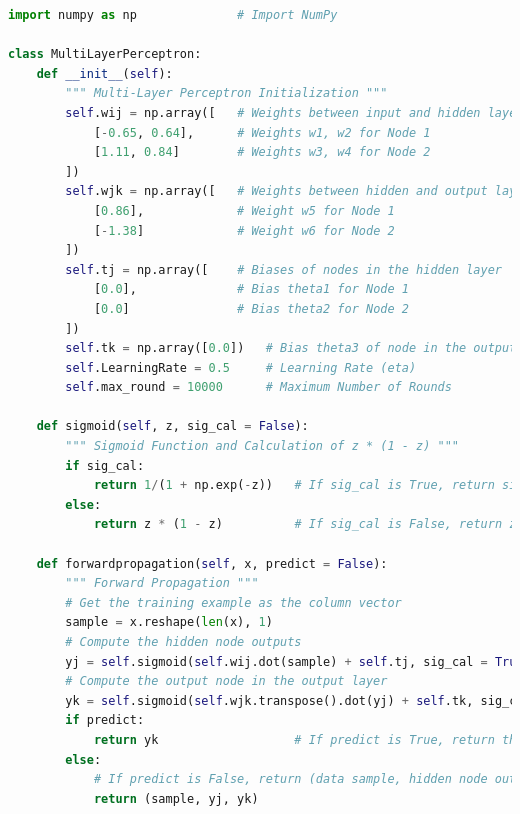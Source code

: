 \documentclass{book}
\begin{document}
\begin{lstlisting}[language=Python, basicstyle=\ttfamily\small, keywordstyle=\color{blue}, commentstyle=\color{forestgreen}, stringstyle=\color{red}, showstringspaces=false]
import numpy as np              # Import NumPy

class MultiLayerPerceptron:
    def __init__(self):
        """ Multi-Layer Perceptron Initialization """
        self.wij = np.array([   # Weights between input and hidden layers
            [-0.65, 0.64],      # Weights w1, w2 for Node 1
            [1.11, 0.84]        # Weights w3, w4 for Node 2
        ])
        self.wjk = np.array([   # Weights between hidden and output layers
            [0.86],             # Weight w5 for Node 1
            [-1.38]             # Weight w6 for Node 2
        ])
        self.tj = np.array([    # Biases of nodes in the hidden layer
            [0.0],              # Bias theta1 for Node 1
            [0.0]               # Bias theta2 for Node 2
        ])
        self.tk = np.array([0.0])   # Bias theta3 of node in the output layer
        self.LearningRate = 0.5     # Learning Rate (eta)
        self.max_round = 10000      # Maximum Number of Rounds

    def sigmoid(self, z, sig_cal = False):
        """ Sigmoid Function and Calculation of z * (1 - z) """
        if sig_cal:
            return 1/(1 + np.exp(-z))   # If sig_cal is True, return sigmoid
        else:
            return z * (1 - z)          # If sig_cal is False, return z * (1 - z)
    
    def forwardpropagation(self, x, predict = False):
        """ Forward Propagation """
        # Get the training example as the column vector
        sample = x.reshape(len(x), 1)                                               # Shape (2, 1)
        # Compute the hidden node outputs
        yj = self.sigmoid(self.wij.dot(sample) + self.tj, sig_cal = True)           # Shape (2, 1)
        # Compute the output node in the output layer
        yk = self.sigmoid(self.wjk.transpose().dot(yj) + self.tk, sig_cal = True)   # Shape (1, 1)
        if predict:
            return yk                   # If predict is True, return the output node in the layer node
        else:
            # If predict is False, return (data sample, hidden node outputs, predicted output)
            return (sample, yj, yk) 
    

\end{lstlisting}
\end{document}
